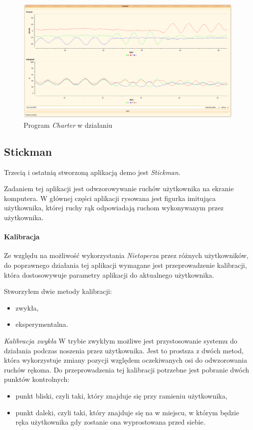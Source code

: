 \begin{figure}
  \includegraphics[width=\textwidth]{gfx/charter.png}
  \caption{Program \textsl{Charter} w działaniu}
  \label{fig:charter}
\end{figure}


\subsection{Stickman}
\label{sec:app_stickman}
Trzecią i ostatnią stworzoną aplikacją demo jest \textsl{Stickman}.

Zadaniem tej aplikacji jest odwzorowywanie ruchów użytkownika na ekranie komputera. W głównej części aplikacji rysowana jest figurka imitująca użytkownika, której ruchy rąk odpowiadają ruchom wykonywanym przez użytkownika.

\paragraph{Kalibracja}
Ze względu na możliwość wykorzystania \textsl{Nietoperza} przez różnych użytkowników, do poprawnego działania tej aplikacji wymagane jest przeprowadzenie kalibracji, która dostosowywuje parametry aplikacji do aktualnego użytkownika.

Stworzyłem dwie metody kalibracji:
\begin{itemize}
  \item zwykła,
  \item eksperymentalna.
\end{itemize}
\newline
\newline
\textsl{Kalibracja zwykła} W trybie zwykłym możliwe jest przystosowanie systemu do działania podczas noszenia przez użytkownika. Jest to prostsza z dwóch metod, która wykorzystuje zmiany pozycji względem oczekiwanych osi do odwzorowania ruchów rękoma. Do przeprowadzenia tej kalibracji potrzebne jest pobranie dwóch punktów kontrolnych:
\begin{itemize}
  \item punkt bliski, czyli taki, który znajduje się przy ramieniu użytkownika,
  \item punkt daleki, czyli taki, który znajduje się na w miejscu, w którym będzie ręka użytkownika gdy zostanie ona wyprostowana przed siebie.
\end{itemize}

